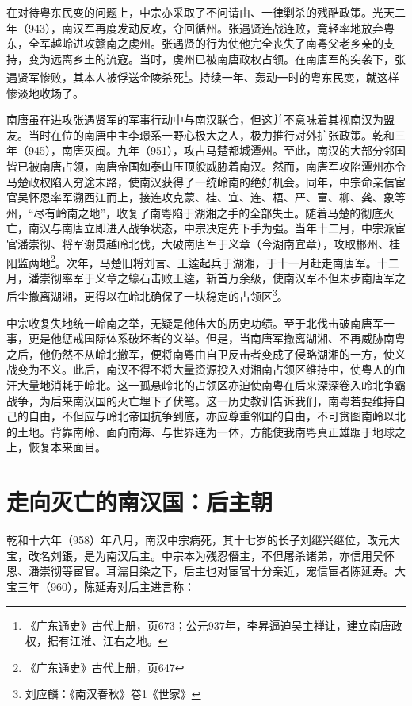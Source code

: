 在对待粤东民变的问题上，中宗亦采取了不问请由、一律剿杀的残酷政策。光天二年（943），南汉军再度发动反攻，夺回循州。张遇贤连战连败，竟轻率地放弃粤东，全军越岭进攻赣南之虔州。张遇贤的行为使他完全丧失了南粤父老乡亲的支持，变为远离乡土的流寇。当时，虔州已被南唐政权占领。在南唐军的突袭下，张遇贤军惨败，其本人被俘送金陵杀死\footnote{《广东通史》古代上册，页673；公元937年，李昇逼迫吴主禅让，建立南唐政权，据有江淮、江右之地。}。持续一年、轰动一时的粤东民变，就这样惨淡地收场了。

南唐虽在进攻张遇贤军的军事行动中与南汉联合，但这并不意味着其视南汉为盟友。当时在位的南唐中主李璟系一野心极大之人，极力推行对外扩张政策。乾和三年（945），南唐灭闽。九年（951），攻占马楚都城潭州。至此，南汉的大部分邻国皆已被南唐占领，南唐帝国如泰山压顶般威胁着南汉。然而，南唐军攻陷潭州亦令马楚政权陷入穷途末路，使南汉获得了一统岭南的绝好机会。同年，中宗命亲信宦官吴怀恩率军溯西江而上，接连攻克蒙、桂、宜、连、梧、严、富、柳、龚、象等州，“尽有岭南之地”，收复了南粤陷于湖湘之手的全部失土。随着马楚的彻底灭亡，南汉与南唐立即进入战争状态，中宗决定先下手为强。当年十二月，中宗派宦官潘崇彻、将军谢贯越岭北伐，大破南唐军于义章（今湖南宜章），攻取郴州、桂阳监两地\footnote{《广东通史》古代上册，页647}。次年，马楚旧将刘言、王逵起兵于湖湘，于十一月赶走南唐军。十二月，潘崇彻率军于义章之蠔石击败王逵，斩首万余级，使南汉军不但未步南唐军之后尘撤离湖湘，更得以在岭北确保了一块稳定的占领区\footnote{刘应麟：《南汉春秋》卷1《世家》}。

中宗收复失地统一岭南之举，无疑是他伟大的历史功绩。至于北伐击破南唐军一事，更是他惩戒国际体系破坏者的义举。但是，当南唐军撤离湖湘、不再威胁南粤之后，他仍然不从岭北撤军，便将南粤由自卫反击者变成了侵略湖湘的一方，使义战变为不义。此后，南汉不得不将大量资源投入对湘南占领区维持中，使粤人的血汗大量地消耗于岭北。这一孤悬岭北的占领区亦迫使南粤在后来深深卷入岭北争霸战争，为后来南汉国的灭亡埋下了伏笔。这一历史教训告诉我们，南粤若要维持自己的自由，不但应与岭北帝国抗争到底，亦应尊重邻国的自由，不可贪图南岭以北的土地。背靠南岭、面向南海、与世界连为一体，方能使我南粤真正雄踞于地球之上，恢复本来面目。

\section{走向灭亡的南汉国：后主朝}


乾和十六年（958）年八月，南汉中宗病死，其十七岁的长子刘继兴继位，改元大宝，改名刘鋹，是为南汉后主。中宗本为残忍僭主，不但屠杀诸弟，亦信用吴怀恩、潘崇彻等宦官。耳濡目染之下，后主也对宦官十分亲近，宠信宦者陈延寿。大宝三年（960），陈延寿对后主进言称：

